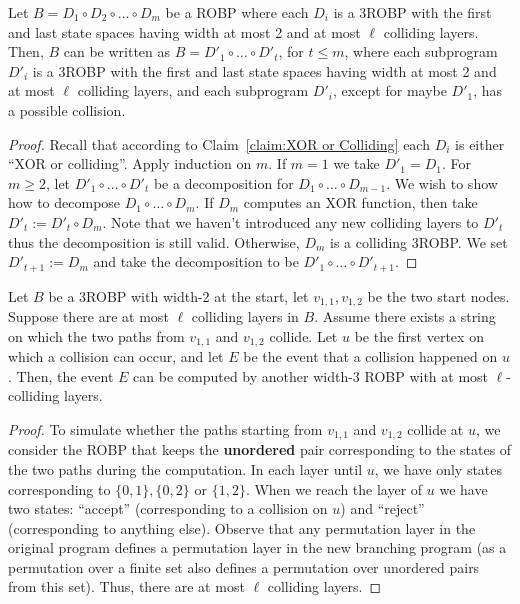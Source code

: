 \begin{claim}[Decomposition]\label{claim:decomposition}
Let $B = D_1  \circ D_2  \circ \ldots \circ D_m$ be a ROBP where each $D_i$ is a 3ROBP with the first and last state spaces having width at most 2 and at most $\ell$ colliding layers.
Then, $B$ can be written as $B = D'_{1} \circ \ldots \circ D'_{t}$, for $t\le m$, where each subprogram $D'_{i}$ is a 3ROBP with the first and last state spaces having width at most 2 and at most $\ell$ colliding layers, and each subprogram $D'_i$, except for maybe $D'_1$, has a possible collision.
\end{claim}
\begin{proof}
	Recall that according to Claim~\ref{claim:XOR or Colliding} each $D_i$ is either ``XOR or colliding''.
	Apply induction on $m$.
	If $m=1$ we take $D'_1 = D_1$.
	For $m\ge 2$, 
	let $D'_1 \circ \ldots \circ D'_t$ be a decomposition for $D_1\circ \ldots \circ D_{m-1}$.
	We wish to show how to decompose $D_1\circ \ldots \circ D_{m}$.
	If $D_{m}$ computes an XOR function, then take $D'_{t} := D'_{t} \circ D_{m}$. Note that we haven't introduced any new colliding layers to $D'_t$ thus the decomposition is still valid. Otherwise, $D_{m}$ is a colliding 3ROBP. We set $D'_{t+1} := D_{m}$ and take the decomposition to be $D'_1 \circ \ldots \circ D'_{t+1}$.
	\end{proof}

\begin{claim}\label{claim:checkcollision}
Let $B$ be a 3ROBP with width-2 at the start, let $v_{1,1}, v_{1,2}$ be the two start nodes.
Suppose there are at most $\ell$ colliding layers in $B$. 
Assume there exists a string on which the two paths from $v_{1,1}$ and $v_{1,2}$ collide.
Let $u$ be the first vertex on which a collision can occur, and let $E$ be the event that a collision happened on $u$. Then, the event $E$ can be computed by another width-$3$ ROBP with at most $\ell$-colliding layers.
\end{claim}

\begin{proof}
To simulate whether the paths starting from $v_{1,1}$ and $v_{1,2}$ collide at $u$, we consider the ROBP that keeps the {\bf unordered} pair corresponding to the states of the two paths during the computation. In each layer until $u$, we have only states corresponding to $\{0,1\}, \{0,2\}$ or $\{1,2\}$. 
When we reach the layer of $u$ we have two states: ``accept'' (corresponding to a collision on $u$) and ``reject'' (corresponding to anything else).
Observe that any permutation layer in the original program defines a permutation layer in the new branching program (as a permutation over a finite set also defines a permutation over unordered pairs from this set). Thus, there are at most $\ell$ colliding layers.
\end{proof}

